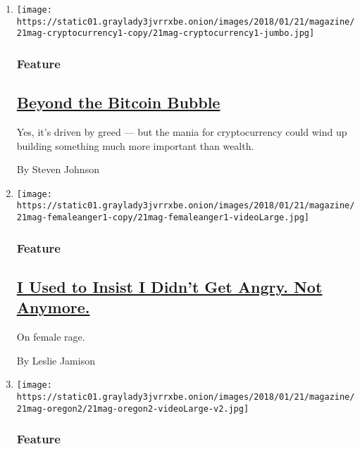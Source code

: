 \begin{enumerate}
\def\labelenumi{\arabic{enumi}.}
\item
  \texttt{[image: https://static01.graylady3jvrrxbe.onion/images/2018/01/21/magazine/21mag-cryptocurrency1-copy/21mag-cryptocurrency1-jumbo.jpg]}

  \hypertarget{feature}{%
  \subsubsection{Feature}\label{feature}}

  \hypertarget{beyond-the-bitcoin-bubble}{%
  \subsection{\texorpdfstring{\href{/2018/01/16/magazine/beyond-the-bitcoin-bubble.html}{Beyond
  the Bitcoin
  Bubble}}{Beyond the Bitcoin Bubble}}\label{beyond-the-bitcoin-bubble}}

  Yes, it's driven by greed --- but the mania for cryptocurrency could
  wind up building something much more important than wealth.

  By Steven Johnson
\item
  \texttt{[image: https://static01.graylady3jvrrxbe.onion/images/2018/01/21/magazine/21mag-femaleanger1-copy/21mag-femaleanger1-videoLarge.jpg]}

  \hypertarget{feature-1}{%
  \subsubsection{Feature}\label{feature-1}}

  \hypertarget{i-used-to-insist-i-didnt-get-angry-not-anymore}{%
  \subsection{\texorpdfstring{\href{/2018/01/17/magazine/i-used-to-insist-i-didnt-get-angry-not-anymore.html}{I
  Used to Insist I Didn't Get Angry. Not
  Anymore.}}{I Used to Insist I Didn't Get Angry. Not Anymore.}}\label{i-used-to-insist-i-didnt-get-angry-not-anymore}}

  On female rage.

  By Leslie Jamison
\item
  \texttt{[image: https://static01.graylady3jvrrxbe.onion/images/2018/01/21/magazine/21mag-oregon2/21mag-oregon2-videoLarge-v2.jpg]}

  \hypertarget{feature-2}{%
  \subsubsection{Feature}\label{feature-2}}


\end{enumerate}
